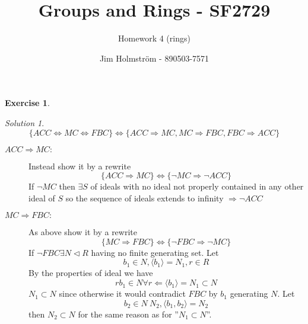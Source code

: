 \documentclass[a4paper,twoside=false,abstract=false,numbers=noenddot,
titlepage=false,headings=small,parskip=half,version=last]{scrartcl}
\author{Jim Holmström - 890503-7571}
\title{Groups and Rings - SF2729}
\subtitle{Homework 4 (rings)}
\theoremstyle{definition}
\newtheorem{exercise}{Exercise}
\theoremstyle{remark}
\newtheorem*{solution}{Solution}
\begin{document}
\maketitle
\thispagestyle{empty}

\begin{exercise}
{\bf
}
\end{exercise}
\begin{solution}

\begin{equation}
    \label{eq:circular}
    \{ACC\Leftrightarrow MC\Leftrightarrow FBC\}
    \Leftrightarrow
    \{ACC\Rightarrow MC,MC\Rightarrow FBC,FBC\Rightarrow ACC\}
\end{equation} 

\begin{description}
    \item[$ACC\Rightarrow MC:$] 
        Instead show it by a rewrite
        \begin{equation}
            \{ACC\Rightarrow MC\}\Leftrightarrow \{\lnot{MC}\Rightarrow \lnot{ACC}\}
        \end{equation}
        If $\lnot{MC}$ then $\exists S$ of ideals with no ideal not properly
        contained in any other ideal of $S$ so the sequence of ideals extends
        to infinity $\Rightarrow \lnot{ACC}$
    \item[$MC\Rightarrow FBC:$]
        As above show it by a rewrite
        \begin{equation}
            \{MC\Rightarrow FBC\}\Leftrightarrow \{\lnot{FBC}\Rightarrow\lnot{MC}\}
        \end{equation}
        If $\lnot{FBC} \exists N \lhd R$ having no finite generating set. 
        Let
        \begin{equation}
            b_1 \in N, \langle b_1 \rangle=N_1,r \in R
        \end{equation}
        By the properties of ideal we have
        \begin{equation}
            rb_1 \in N \forall r \Leftarrow \langle b_1 \rangle=N_1 \subset N 
        \end{equation}
        $N_1 \subset N$ since otherwise it would contradict $FBC$ by $b_1$
        generating $N$.
        Let 
        \begin{equation}
            b_2\in N\ N_2, \langle b_1,b_2 \rangle =N_2
        \end{equation}
        then $N_2 \subset N$ for the same reason as for ''$N_1 \subset N$''.
        \begin{equation}

\end{equation}
\end{description}
\end{solution}
\end{document}

